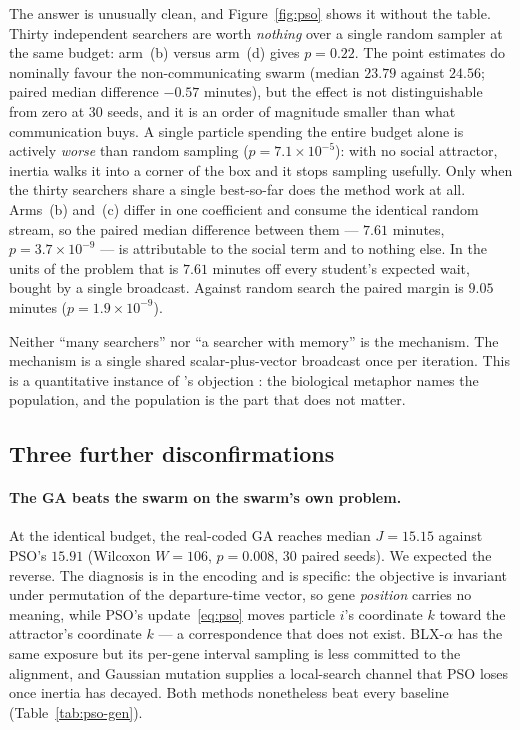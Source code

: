 \documentclass[11pt]{article}
\begin{document}
The answer is unusually clean, and Figure~\ref{fig:pso} shows it without the table. Thirty
independent searchers are worth \emph{nothing} over a single
random sampler at the same budget: arm~(b) versus arm~(d) gives $p = 0.22$. The point estimates do
nominally favour the non-communicating swarm (median $23.79$ against $24.56$; paired median
difference $-0.57$ minutes), but the effect is not distinguishable from zero at 30 seeds, and it is
an order of magnitude smaller than what communication buys. A single particle spending the entire budget alone is actively
\emph{worse} than random sampling ($p = 7.1\times 10^{-5}$): with no social attractor, inertia
walks it into a corner of the box and it stops sampling usefully. Only when the thirty searchers
share a single best-so-far does the method work at all. Arms~(b) and~(c) differ in one coefficient
and consume the identical random stream, so the paired median difference between them --- $7.61$
minutes, $p = 3.7\times 10^{-9}$ --- is attributable to the social term and to nothing else. In the
units of the problem that is $7.61$ minutes off every student's expected wait, bought by a single
broadcast. Against random search the paired margin is $9.05$ minutes ($p = 1.9\times10^{-9}$).

Neither ``many searchers'' nor ``a searcher with memory'' is the mechanism. The mechanism is a
single shared scalar-plus-vector broadcast once per iteration. This is a quantitative instance of
\citeauthor{sorensen2015metaheuristics}'s objection \citep{sorensen2015metaheuristics}: the
biological metaphor names the population, and the population is the part that does not matter.

\subsection{Three further disconfirmations}

\paragraph{The GA beats the swarm on the swarm's own problem.} At the identical budget, the
real-coded GA reaches median $J = 15.15$ against PSO's $15.91$ (Wilcoxon $W = 106$, $p = 0.008$,
30 paired seeds). We expected the reverse. The diagnosis is in the encoding and is specific: the
objective is invariant under permutation of the departure-time vector, so gene \emph{position}
carries no meaning, while PSO's update~\eqref{eq:pso} moves particle $i$'s coordinate $k$ toward
the attractor's coordinate $k$ --- a correspondence that does not exist. BLX-$\alpha$
\citep{eshelman1993real} has the same exposure but its per-gene interval sampling is less committed
to the alignment, and Gaussian mutation supplies a local-search channel that PSO loses once inertia
has decayed. Both methods nonetheless beat every baseline (Table~\ref{tab:pso-gen}).
\end{document}
